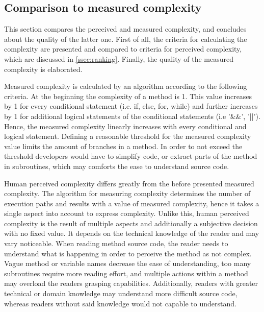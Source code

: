 \documentclass[conference]{IEEEtran}
\begin{document}
\subsection{Comparison to measured complexity}
\label{ssec:comparison}
This section compares the perceived and measured complexity, and concludes about the quality of the latter one. First of all, the criteria for calculating the complexity are presented and compared to criteria for perceived complexity, which are discussed in \cref{ssec:ranking}. Finally, the quality of the measured complexity is elaborated.

Measured complexity is calculated by an algorithm according to the following criteria. At the beginning the complexity of a method is 1. This value increases by 1 for every conditional statement (i.e. if, else, for, while) and further increases by 1 for additional logical statements of the conditional statements (i.e '\&\&', '||'). Hence, the measured complexity linearly increases with every conditional and logical statement. Defining a reasonable threshold for the measured complexity value limits the amount of branches in a method. In order to not exceed the threshold developers would have to simplify code, or extract parts of the method in subroutines, which may comforts the ease to understand source code.

Human perceived complexity differs greatly from the before presented measured complexity. The algorithm for measuring complexity determines the number of execution paths and results with a value of measured complexity, hence it takes a single aspect into account to express complexity. Unlike this, human perceived complexity is the result of multiple aspects and additionally a subjective decision with no fixed value. It depends on the technical knowledge of the reader and may vary noticeable. When reading method source code, the reader needs to understand what is happening in order to perceive the method as not complex. Vague method or variable names decrease the ease of understanding, too many subroutines require more reading effort, and multiple actions within a method may overload the readers grasping capabilities. Additionally, readers with greater technical or domain knowledge may understand more difficult source code, whereas readers without said knowledge would not capable to understand. 
\end{document}
